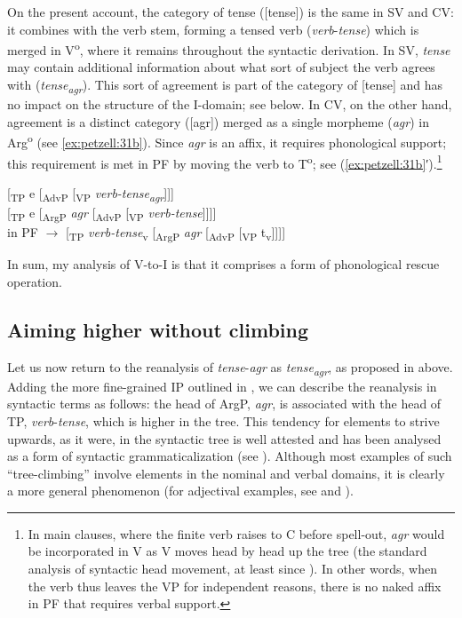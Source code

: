 \documentclass[output=paper,colorlinks,citecolor=brown,draft,draftmode]{langscibook}
\begin{document}
On the present account, the category of tense ([tense]) is the same in SV and CV: it combines with the verb stem, forming a tensed verb (\textit{verb}-\textit{tense}) which is merged in V\textsuperscript{o}, where it remains throughout the syntactic derivation. In SV, \textit{tense} may contain additional information about what sort of subject the verb agrees with (\textit{tense\textsubscript{agr}}). This sort of agreement is part of the category of [tense] and has no impact on the structure of the I-domain; see  below. In CV, on the other hand, agreement is a distinct category ([agr]) merged as a single morpheme (\textit{agr}) in Arg\textsuperscript{o} (see \ref{ex:petzell:31b}). Since \textit{agr} is an affix, it requires phonological support; this requirement is met in PF by moving the verb to T\textsuperscript{o}; see (\ref{ex:petzell:31b}′).\footnote{In
    main clauses, where the finite verb raises to C before spell-out, \textit{agr} would be incorporated in V as V moves head by head up the tree (the standard analysis of syntactic head movement, at least since \citealt{Chomsky2001}). In other words, when the verb thus leaves the VP for independent reasons, there is no naked affix in PF that requires verbal support.
}


\ea\label{ex:petzell:31}
\ea\label{ex:petzell:31a}  [\textsubscript{TP} e [\textsubscript{AdvP} [\textsubscript{VP} \textit{verb-tense\textsubscript{agr}}]]]\\
\ex\label{ex:petzell:31b}   [\textsubscript{TP} e [\textsubscript{ArgP} \textit{agr} [\textsubscript{AdvP} [\textsubscript{VP} \textit{verb-tense}]]]]  \\
  in PF $\to$ [\textsubscript{TP} \textit{verb-tense}\textsubscript{v} [\textsubscript{ArgP} \textit{agr} [\textsubscript{AdvP} [\textsubscript{VP} t\textsubscript{v}]]]]
\z
\z


In sum, my analysis of V-to-I is that it comprises a form of phonological rescue operation.


\subsection{Aiming higher without climbing}\label{sec:petzell:5.2}


Let us now return to the reanalysis of \textit{tense}-\textit{agr} as \textit{tense\textsubscript{agr}}, as proposed in  above. Adding the more fine-grained IP outlined in , we can describe the reanalysis in syntactic terms as follows: the head of ArgP, \textit{agr}, is associated with the head of TP, \textit{verb}-\textit{tense}, which is higher in the tree. This tendency for elements to strive upwards, as it were, in the syntactic tree is well attested and has been analysed as a form of syntactic grammaticalization (see \citealt{RobertsRoussou1999,RobertsRoussou2003}). Although most examples of such “tree-climbing” involve elements in the nominal and verbal domains, it is clearly a more general phenomenon (for adjectival examples, see \citealt{Oxford2017} and ).
\end{document}
